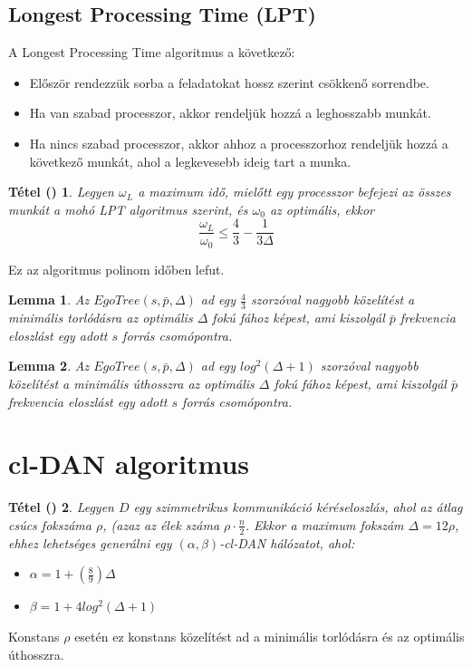 \documentclass[12pt]{report}
\newtheorem{mytetel}{Tétel (\cite{avin_demand-aware_nodate})}
\newtheorem{mylemma}{Lemma}
\begin{document}
\subsection{Longest Processing Time (LPT)}

A Longest Processing Time algoritmus a következő:

\begin{itemize}
	\item Először rendezzük sorba a feladatokat hossz szerint csökkenő sorrendbe.
	\item Ha van szabad processzor, akkor rendeljük hozzá a leghosszabb munkát.
	\item Ha nincs szabad processzor, akkor ahhoz a processzorhoz rendeljük hozzá a következő munkát, ahol a legkevesebb ideig tart a munka.
\end{itemize}

\begin{mytetel}
	Legyen \(\omega_L\) a maximum idő, mielőtt egy processzor befejezi az összes munkát a mohó LPT algoritmus szerint, és \(\omega_0\) az optimális, ekkor \[\frac{\omega_L}{\omega_0} \le \frac{4}{3} - \frac{1}{3\Delta}\]
\end{mytetel}

Ez az algoritmus polinom időben lefut.

\begin{mylemma}
	Az \(EgoTree(s, \bar{p}, \Delta)\) ad egy \(\frac{4}{3}\) szorzóval nagyobb közelítést a minimális torlódásra az optimális \(\Delta\) fokú fához képest, ami kiszolgál \(\bar{p}\) frekvencia eloszlást egy adott \(s\) forrás csomópontra.
\end{mylemma}

\begin{mylemma}
	Az \(EgoTree(s, \bar{p}, \Delta)\) ad egy \(log^2(\Delta + 1)\) szorzóval nagyobb közelítést a minimális úthosszra az optimális \(\Delta\) fokú fához képest, ami kiszolgál \(\bar{p}\) frekvencia eloszlást egy adott \(s\) forrás csomópontra.
\end{mylemma}

\section{cl-DAN algoritmus}

\begin{mytetel}
	Legyen \(D\) egy szimmetrikus kommunikáció kéréseloszlás, ahol az átlag csúcs fokszáma \(\rho\), (azaz az élek száma \(\rho \cdot \frac{n}{2}\). Ekkor a maximum fokszám \(\Delta = 12\rho\), ehhez lehetséges generálni egy \((\alpha, \beta)\)-cl-DAN hálózatot, ahol:
	\begin{itemize}
		\item \(\alpha = 1 + (\frac{8}{9})\Delta\)
		\item \(\beta = 1 + 4log^2(\Delta + 1)\)
	\end{itemize}
\end{mytetel}
Konstans \(\rho\) esetén ez konstans közelítést ad a minimális torlódásra és az optimális úthosszra.
\end{document}
